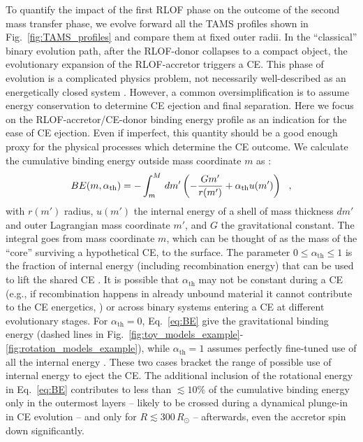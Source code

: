 \documentclass[twocolumn,twocolappendix,trackchanges]{aastex63}
\DeclareRobustCommand{\Eqref}[1]{Eq.~\ref{#1}}
\DeclareRobustCommand{\Figref}[1]{Fig.~\ref{#1}}
\begin{document}
To quantify the impact of the first RLOF phase on the outcome of the
second mass transfer phase, we evolve forward all the TAMS profiles
shown in \Figref{fig:TAMS_profiles} and compare them at fixed outer
radii. In the ``classical'' binary evolution path, after the
RLOF-donor collapses to a compact object, the evolutionary expansion
of the RLOF-accretor triggers a CE. This phase of evolution is a
complicated physics problem, not necessarily well-described as an
energetically closed system \citep[e.g.,][]{ivanova:2013,
  ivanova:2020, renzo:21gwce}.
However, a common oversimplification is to assume energy conservation
\citep[``$\alpha_{\mathrm{CE}}\lambda_\mathrm{CE}$ algorithm'',
e.g.,][]{webbink:1984, dekool:1990, demarco:11} to determine CE
ejection and final separation. Here we focus on the
RLOF-accretor/CE-donor binding energy profile as an indication for the
ease of CE ejection. Even if imperfect, this quantity should be a good
enough proxy for the physical processes which determine the CE
outcome. We calculate the cumulative binding energy outside mass
coordinate $m$ as \citep[e.g.,][]{dekool:1990, dewi:2000,
  lau:2022}:
\begin{equation}
  \label{eq:BE}
BE(m, \alpha_{\rm th}) = - \int_{m}^M\,dm'\left( -\frac{G m'}{r(m')}+\alpha_\mathrm{th} u(m')\right) \ \ ,
\end{equation}
with $r(m')$ radius, $u(m')$ the internal energy of a shell of mass
thickness $dm'$ and outer Lagrangian mass coordinate $m'$, and $G$ the
gravitational constant. The integral goes from mass coordinate
$m$, which can be thought of as the mass of the ``core'' surviving a
hypothetical CE, to the surface. The parameter
$0\leq \alpha_\mathrm{th}\leq 1$ is the fraction of internal energy
(including recombination energy) that can be used to lift the shared
CE \citep[e.g.,][]{han:95}. It is possible that $\alpha_\mathrm{th}$ may not be constant
during a CE (e.g., if recombination happens in already unbound
material it cannot contribute to the CE energetics, \citealt{lau:22}) or across binary
systems entering a CE at different evolutionary stages. For
$\alpha_\mathrm{th}=0$, \Eqref{eq:BE} give the gravitational binding
energy (dashed lines in
\Figref{fig:toy_models_example}-\ref{fig:rotation_models_example}),
while $\alpha_{\mathrm{th}}=1$ assumes perfectly fine-tuned use of all
the internal energy \citep[solid lines,][]{klencki:2020}. These two
cases bracket the range of possible use of internal energy to eject
the CE. The additional inclusion of the rotational
energy in \Eqref{eq:BE}
contributes to less than $\lesssim 10\%$ of the cumulative binding
energy only in the outermost layers -- likely to be crossed during a
dynamical plunge-in in CE evolution -- and only for $R\lesssim 300\,R_\odot$
-- afterwards, even the accretor spin down significantly.
\end{document}
